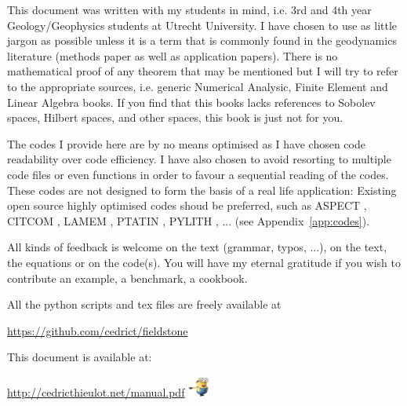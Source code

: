
This document was written with my students in mind, i.e. 3rd and 4th year 
Geology/Geophysics students at Utrecht University. 
I have chosen to use as little jargon as possible unless it is a term that is 
commonly found in the geodynamics literature (methods paper as well as 
application papers). There is no mathematical proof of any theorem that may 
be mentioned but I will try to refer to the appropriate sources, i.e.
generic Numerical Analysic, Finite Element and 
Linear Algebra books. If you find that this books lacks references
to Sobolev spaces, Hilbert spaces, and other spaces, this book is just not for you.  

The codes I provide here are by no means optimised as I have chosen code readability 
over code efficiency. I have also chosen to avoid resorting to multiple code 
files or even functions in order to favour a sequential reading of the codes. 
These codes are not designed to form the basis of a real life application:
Existing open source highly optimised codes shoud be preferred, such as 
ASPECT \cite{krhb12,hedg17}, CITCOM \cite{zhzm00,zhmt08}, LAMEM \cite{kapb16}, 
PTATIN \cite{mabl14,mabl15}, PYLITH \cite{aakw13}, ... (see Appendix~\ref{app:codes}).

All kinds of feedback is welcome on the text (grammar, typos, ...), on the text, the equations
or on the code(s). You will have my eternal gratitude if you wish to contribute an 
example, a benchmark, a cookbook. 

All the python scripts and tex files are freely available at 
\begin{center}
\url{https://github.com/cedrict/fieldstone}
\end{center}
This document is available at:
\begin{center}
\url{http://cedricthieulot.net/manual.pdf}  \includegraphics[width=0.7cm]{images/minion}
\end{center}


